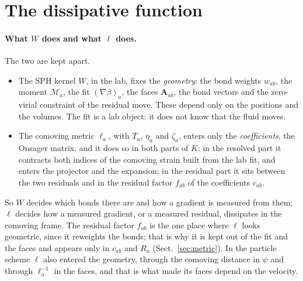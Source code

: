 \documentclass[11pt,aps,preprint,nofootinbib,superscriptaddress,tightenlines]{revtex4-2}
\def\Sect#1{Sect.~\ref{#1}}
\let\oldparagraph\paragraph
\renewcommand{\paragraph}{\par\bigskip\oldparagraph}
\begin{document}
\section{The dissipative function}
\label{sec:K}

\paragraph{What $W$ does and what $\ell$ does.}  The two are kept apart.
\begin{itemize}
\item The SPH kernel $W$, in the lab, fixes the \emph{geometry}: the bond weights $w_{ab}$, the moment $\mathcal M_a$, the fit $(\nabla\beta)_a$, the faces
  $\bm A_{ab}$, the bond vectors and the zero-virial constraint of the residual move.  These depend only on the positions and the volumes.
  The fit is a lab object: it does not know that the fluid moves.
\item The comoving metric $\ell_a$, with $T_a$, $\eta_a$ and $\zeta_a$, enters only the \emph{coefficients}, the Onsager matrix, and it does so in both
  parts of $K$: in the resolved part it contracts both indices of the comoving strain built from the lab fit, and enters the projector
  and the expansion; in the residual part it sits between the two residuals and in the residual factor $f_{ab}$ of the coefficients
  $c_{ab}$.
\end{itemize}
So $W$ decides which bonds there are and how a gradient is measured from them; $\ell$ decides how a measured gradient, or a measured
residual, dissipates in the comoving frame.  The residual factor $f_{ab}$ is the one place where $\ell$ looks geometric, since it reweights the
bonds; that is why it is kept out of the fit and the faces and appears only in $c_{ab}$ and $R_a$ (\Sect{sec:metric}).  In the particle scheme
$\ell$ also entered the geometry, through the comoving distance in $\psi$ and through $\ell_a^{-1}$ in the faces, and that is what made its faces
depend on the velocity.
\end{document}
